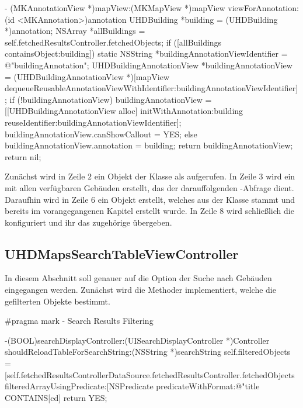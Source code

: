 \documentclass{report}
\begin{document}
\begin{objclst}
- (MKAnnotationView *)mapView:(MKMapView *)mapView viewForAnnotation:(id <MKAnnotation>)annotation {
    UHDBuilding *building = (UHDBuilding *)annotation;
    NSArray *allBuildings = self.fetchedResultsController.fetchedObjects;    
    if ([allBuildings containsObject:building]) {
        static NSString *buildingAnnotationViewIdentifier = @"buildingAnnotation";
        UHDBuildingAnnotationView *buildingAnnotationView = (UHDBuildingAnnotationView *)[mapView dequeueReusableAnnotationViewWithIdentifier:buildingAnnotationViewIdentifier];
        if (!buildingAnnotationView) {
            buildingAnnotationView = [[UHDBuildingAnnotationView alloc] initWithAnnotation:building reuseIdentifier:buildingAnnotationViewIdentifier];
            buildingAnnotationView.canShowCallout = YES;
        } else {
            buildingAnnotationView.annotation = building; 
       	}        
        return buildingAnnotationView;
    }
    return nil;
}
\end{objclst}

Zunächst wird in Zeile $2$ ein Objekt der Klasse  als  aufgerufen. In Zeile $3$ wird ein  mit allen verfügbaren Gebäuden erstellt, das der darauffolgenden -Abfrage dient. Daraufhin wird in Zeile $6$ ein Objekt  erstellt, welches aus der Klasse  stammt und bereits im vorangegangenen Kapitel erstellt wurde. In Zeile $8$ wird schließlich die  konfiguriert und ihr das zugehörige  übergeben. 

\subsection{UHDMapsSearchTableViewController} \label{subsection_1}

In diesem Abschnitt soll genauer auf die Option der Suche nach Gebäuden eingegangen werden. Zunächst wird die Methoder  implementiert, welche die gefilterten Objekte bestimmt. 

\begin{objclst}
#pragma mark - Search Results Filtering

-(BOOL)searchDisplayController:(UISearchDisplayController *)Controller shouldReloadTableForSearchString:(NSString *)searchString
{    
    self.filteredObjects = [self.fetchedResultsControllerDataSource.fetchedResultsController.fetchedObjects filteredArrayUsingPredicate:[NSPredicate predicateWithFormat:@"title CONTAINS[cd] %
    return YES;
}
\end{objclst}
\end{document}
